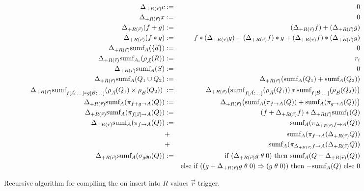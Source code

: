 \documentclass{vldb}
\begin{document}
\begin{figure}[t!]
\begin{eqnarray*}
\Delta_{+R(\vec{r})} c       &:=& 0 \\
\Delta_{+R(\vec{r})} x       &:=& 0 \\
\Delta_{+R(\vec{r})} (f + g) &:=&  (\Delta_{+R(\vec{r})} f) + (\Delta_{+R(\vec{r})} g) \\
\Delta_{+R(\vec{r})} (f * g) &:=& f * (\Delta_{+R(\vec{r})} g) 
                              +   (\Delta_{+R(\vec{r})} f) * g                        
                              +   (\Delta_{+R(\vec{r})} f) * (\Delta_{+R(\vec{r})} g)
\\
\Delta_{+R(\vec{r})} \mbox{sumf}_A(\{ \vec{a} \}) &:=& 0
\\
\Delta_{+R(\vec{r})} \mbox{sumf}_{A_i}(\rho_{\vec{A}}(R)) &:=& r_i
\\
\Delta_{+R(\vec{r})} \mbox{sumf}_A(S) &:=& 0
\\
\Delta_{+R(\vec{r})}  \mbox{sumf}_A(Q_1 \cup Q_2) &:=&
\Delta_{+R(\vec{r})} (\mbox{sumf}_A(Q_1) + \mbox{sumf}_A(Q_2))
\\
\Delta_{+R(\vec{r})} \mbox{sumf}_{f[\vec{A};\dots] * g[\vec{B};\dots]}(\rho_{\vec{A}}(Q_1) \times \rho_{\vec{B}}(Q_2)) \; &:=&
\Delta_{+R(\vec{r})} \big( \mbox{sumf}_{f[\vec{A};\dots]}(\rho_{\vec{A}}(Q_1))
    * \mbox{sumf}_{f[\vec{B};\dots]}(\rho_{\vec{B}}(Q_2)) \big)
\\
\Delta_{+R(\vec{r})} \mbox{sumf}_A(\pi_{f + g \rightarrow A}(Q)) &:=&
\Delta_{+R(\vec{r})} \big( \mbox{sumf}_A(\pi_{f \rightarrow A}(Q))
   + \mbox{sumf}_A(\pi_{g \rightarrow A}(Q)) \big)
\\
\Delta_{+R(\vec{r})} \mbox{sumf}_A(\pi_{f[\vec{x}] \rightarrow A}(Q)) &:=&
   (f + \Delta_{+R(\vec{r})} f)
   * \Delta_{+R(\vec{r})} \mbox{sumf}_1(Q)
\\
\Delta_{+R(\vec{r})} \mbox{sumf}_A(\pi_{f \rightarrow A}(Q)) &:=&
   \mbox{sumf}_A(\pi_{\Delta_{+R(\vec{r})} f \rightarrow A}(Q)) \\
   &+& \mbox{sumf}_A(\pi_{f \rightarrow A}(\Delta_{+R(\vec{r})} Q)) \\
   &+& \mbox{sumf}_A(\pi_{\Delta_{+R(\vec{r})} f \rightarrow A}(\Delta_{+R(\vec{r})} Q))
\\
\Delta_{+R(\vec{r})} \mbox{sumf}_A(\sigma_{g \theta 0}(Q)) &:=&
\mbox{if ($\Delta_{+R(\vec{r})} g \;\theta\; 0$) then
   $\mbox{sumf}_A(Q + \Delta_{+R(\vec{r})}(Q))$} \\
&& \mbox{else if ($(g + \Delta_{+R(\vec{r})} g \;\theta\; 0) \Rightarrow
(g \;\theta\; 0)$) then $- \mbox{sumf}_A(Q)$ else 0}
\end{eqnarray*}
%
\caption{Recursive algorithm for compiling the
on insert into $R$ values $\vec{r}$ trigger.}
\label{fig:mainalg}
\end{figure}
\end{document}
